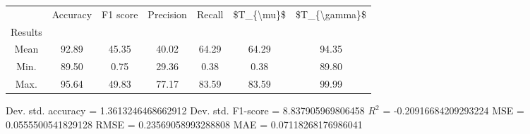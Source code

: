 \begin{tabular}{|c|c|c|c|c|c|c|}
\toprule
{} &  Accuracy &  F1 score &  Precision &  Recall &  \$T\_\{\textbackslash mu\}\$ &  \$T\_\{\textbackslash gamma\}\$ \\
Results &           &           &            &         &            &               \\
\hline
Mean    &     92.89 &     45.35 &      40.02 &   64.29 &      64.29 &         94.35 \\
Min.    &     89.50 &      0.75 &      29.36 &    0.38 &       0.38 &         89.80 \\
Max.    &     95.64 &     49.83 &      77.17 &   83.59 &      83.59 &         99.99 \\
\bottomrule
\end{tabular}

 Dev. std. accuracy = 1.3613246468662912
 Dev. std. F1-score = 8.837905969806458
 $R^2$ = -0.20916684209293224
 MSE = 0.0555500541829128
 RMSE = 0.23569058993288808
 MAE = 0.07118268176986041
